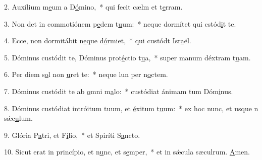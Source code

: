 2. Auxílium m\uline{e}um a D\uline{ó}mino,~* qui fecit cælm et t\uline{e}rram.\par 
3. Non det in commotiónem p\uline{e}dem t\uline{u}um:~* neque dormítet qui cstód\uline{i}t te.\par 
4. Ecce, non dormitábit n\uline{e}que d\uline{ó}rmiet,~* qui custódt Isr\uline{a}ël.\par 
5. Dóminus custódit te, Dóminus prot\uline{é}ctio t\uline{u}a,~* super manum déxtram t\uline{u}am.\par 
6. Per diem s\uline{o}l non \uline{u}ret te:~* neque lun per n\uline{o}ctem.\par 
7. Dóminus custódit te ab \uline{o}mni m\uline{a}lo:~* custódiat ánimam tum Dóm\uline{i}nus.\par 
8. Dóminus custódiat intróitum tuum, et \uline{é}xitum t\uline{u}um:~* ex hoc nunc, et usque n sǽc\uline{u}lum.\par 
9. Glória P\uline{a}tri, et F\uline{í}lio,~* et Spiríti S\uline{a}ncto.\par 
10. Sicut erat in princípio, et n\uline{u}nc, et s\uline{e}mper,~* et in sǽcula sæculrum. \uline{A}men.\par 
